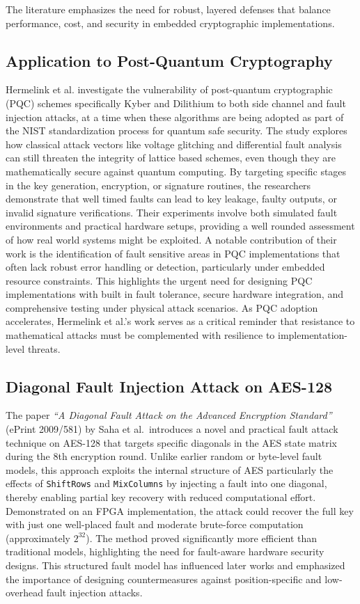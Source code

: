 The literature emphasizes the need for robust, layered defenses that balance performance, cost, and security in embedded cryptographic implementations.

\subsection*{Application to Post-Quantum Cryptography \cite{hermelink2023side}}
Hermelink et al. investigate the vulnerability of post-quantum cryptographic (PQC) schemes specifically Kyber and Dilithium to both side channel and fault injection attacks, at a time when these algorithms are being adopted as part of the NIST standardization process for quantum safe security. The study explores how classical attack vectors like voltage glitching and differential fault analysis can still threaten the integrity of lattice based schemes, even though they are mathematically secure against quantum computing. By targeting specific stages in the key generation, encryption, or signature routines, the researchers demonstrate that well timed faults can lead to key leakage, faulty outputs, or invalid signature verifications. Their experiments involve both simulated fault environments and practical hardware setups, providing a well rounded assessment of how real world systems might be exploited. A notable contribution of their work is the identification of fault sensitive areas in PQC implementations that often lack robust error handling or detection, particularly under embedded resource constraints. This highlights the urgent need for designing PQC implementations with built in fault tolerance, secure hardware integration, and comprehensive testing under physical attack scenarios. As PQC adoption accelerates, Hermelink et al.'s work serves as a critical reminder that resistance to mathematical attacks must be complemented with resilience to implementation-level threats.

\subsection*{Diagonal Fault Injection Attack on AES-128 \cite{Saha2009ADF}}
The paper \textit{``A Diagonal Fault Attack on the Advanced Encryption Standard''} (ePrint 2009/581) by Saha et al.\ introduces a novel and practical fault attack technique on AES-128 that targets specific diagonals in the AES state matrix during the 8th encryption round. Unlike earlier random or byte-level fault models, this approach exploits the internal structure of AES particularly the effects of \texttt{ShiftRows} and \texttt{MixColumns} by injecting a fault into one diagonal, thereby enabling partial key recovery with reduced computational effort. Demonstrated on an FPGA implementation, the attack could recover the full key with just one well-placed fault and moderate brute-force computation (approximately $2^{32}$). The method proved significantly more efficient than traditional models, highlighting the need for fault-aware hardware security designs. This structured fault model has influenced later works and emphasized the importance of designing countermeasures against position-specific and low-overhead fault injection attacks.


